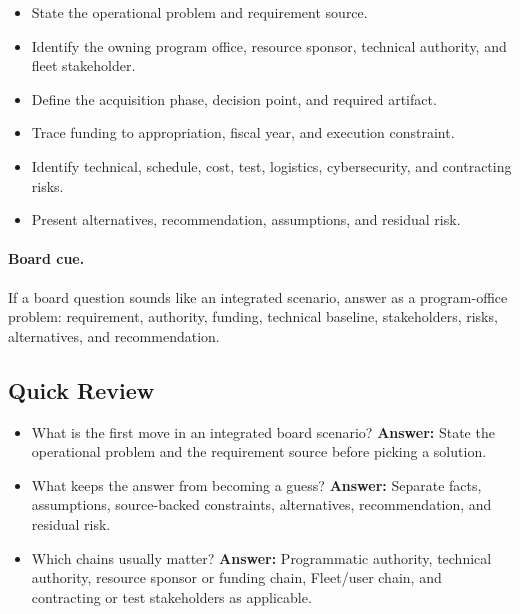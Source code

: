 \documentclass[../main.tex]{subfiles}
\begin{document}
\begin{itemize}
  \item State the operational problem and requirement source.
  \item Identify the owning program office, resource sponsor, technical authority, and fleet stakeholder.
  \item Define the acquisition phase, decision point, and required artifact.
  \item Trace funding to appropriation, fiscal year, and execution constraint.
  \item Identify technical, schedule, cost, test, logistics, cybersecurity, and contracting risks.
  \item Present alternatives, recommendation, assumptions, and residual risk.
\end{itemize}

\paragraph{Board cue.}
If a board question sounds like an integrated scenario, answer as a
program-office problem: requirement, authority, funding, technical baseline,
stakeholders, risks, alternatives, and recommendation.

\subsection{Quick Review}
\begin{itemize}
  \item What is the first move in an integrated board scenario? \textbf{Answer:} State the operational
  problem and the requirement source before picking a solution.
  \item What keeps the answer from becoming a guess? \textbf{Answer:} Separate facts, assumptions,
  source-backed constraints, alternatives, recommendation, and residual risk.
  \item Which chains usually matter? \textbf{Answer:} Programmatic authority, technical authority, resource
  sponsor or funding chain, Fleet/user chain, and contracting or test stakeholders as applicable.
\end{itemize}

\end{document}
